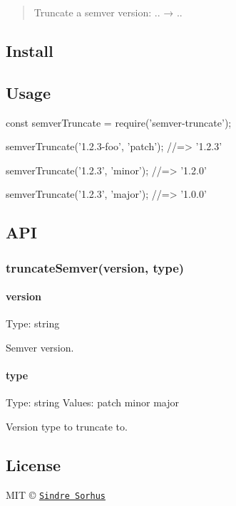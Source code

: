 \begin{quote}
Truncate a semver version\+: {..} → {..} \end{quote}


\subsection*{Install}




\subsection*{Usage}


\begin{DoxyCode}
const semverTruncate = require('semver-truncate');

semverTruncate('1.2.3-foo', 'patch');
//=> '1.2.3'

semverTruncate('1.2.3', 'minor');
//=> '1.2.0'

semverTruncate('1.2.3', 'major');
//=> '1.0.0'
\end{DoxyCode}


\subsection*{A\+PI}

\subsubsection*{truncate\+Semver(version, type)}

\paragraph*{version}

Type\+: {\ttfamily string}

Semver version.

\paragraph*{type}

Type\+: {\ttfamily string} Values\+: {\ttfamily patch} {\ttfamily minor} {\ttfamily major}

Version type to truncate to.

\subsection*{License}

M\+IT © \href{https://sindresorhus.com}{\tt Sindre Sorhus} 